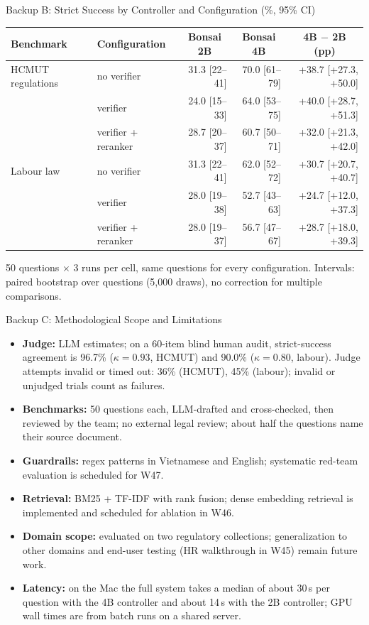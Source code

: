 \documentclass[aspectratio=1610,11pt]{beamer}
\newcommand{\cell}[1]{\multicolumn{1}{c}{#1}}
\begin{document}
\begin{frame}{Backup B: Strict Success by Controller and Configuration (\%, 95\% CI)}
  \footnotesize
  \centering
  \begin{tabular}{@{}llrrr@{}}
    \toprule Benchmark & Configuration & \cell{Bonsai 2B} & \cell{Bonsai 4B} & \cell{4B $-$ 2B (pp)}\\\midrule
    HCMUT regulations & no verifier & 31.3 [22--41] & 70.0 [61--79] & +38.7 [+27.3, +50.0]\\
    & verifier & 24.0 [15--33] & 64.0 [53--75] & +40.0 [+28.7, +51.3]\\
    & verifier + reranker & 28.7 [20--37] & 60.7 [50--71] & +32.0 [+21.3, +42.0]\\\midrule
    Labour law & no verifier & 31.3 [22--41] & 62.0 [52--72] & +30.7 [+20.7, +40.7]\\
    & verifier & 28.0 [19--38] & 52.7 [43--63] & +24.7 [+12.0, +37.3]\\
    & verifier + reranker & 28.0 [19--37] & 56.7 [47--67] & +28.7 [+18.0, +39.3]\\
    \bottomrule
  \end{tabular}
  \vspace{8pt}

  \raggedright
  50 questions $\times$ 3 runs per cell, same questions for every configuration. Intervals: paired bootstrap over questions (5,000 draws), no correction for multiple comparisons.
\end{frame}

\begin{frame}{Backup C: Methodological Scope and Limitations}
  \footnotesize
  \begin{itemize}
    \item \textbf{Judge:} LLM estimates; on a 60-item blind human audit, strict-success agreement is 96.7\% ($\kappa=0.93$, HCMUT) and 90.0\% ($\kappa=0.80$, labour). Judge attempts invalid or timed out: 36\% (HCMUT), 45\% (labour); invalid or unjudged trials count as failures.
    \item \textbf{Benchmarks:} 50 questions each, LLM-drafted and cross-checked, then reviewed by the team; no external legal review; about half the questions name their source document.
    \item \textbf{Guardrails:} regex patterns in Vietnamese and English; systematic red-team evaluation is scheduled for W47.
    \item \textbf{Retrieval:} BM25 + TF-IDF with rank fusion; dense embedding retrieval is implemented and scheduled for ablation in W46.
    \item \textbf{Domain scope:} evaluated on two regulatory collections; generalization to other domains and end-user testing (HR walkthrough in W45) remain future work.
    \item \textbf{Latency:} on the Mac the full system takes a median of about 30\,s per question with the 4B controller and about 14\,s with the 2B controller; GPU wall times are from batch runs on a shared server.
  \end{itemize}
\end{frame}
\end{document}
